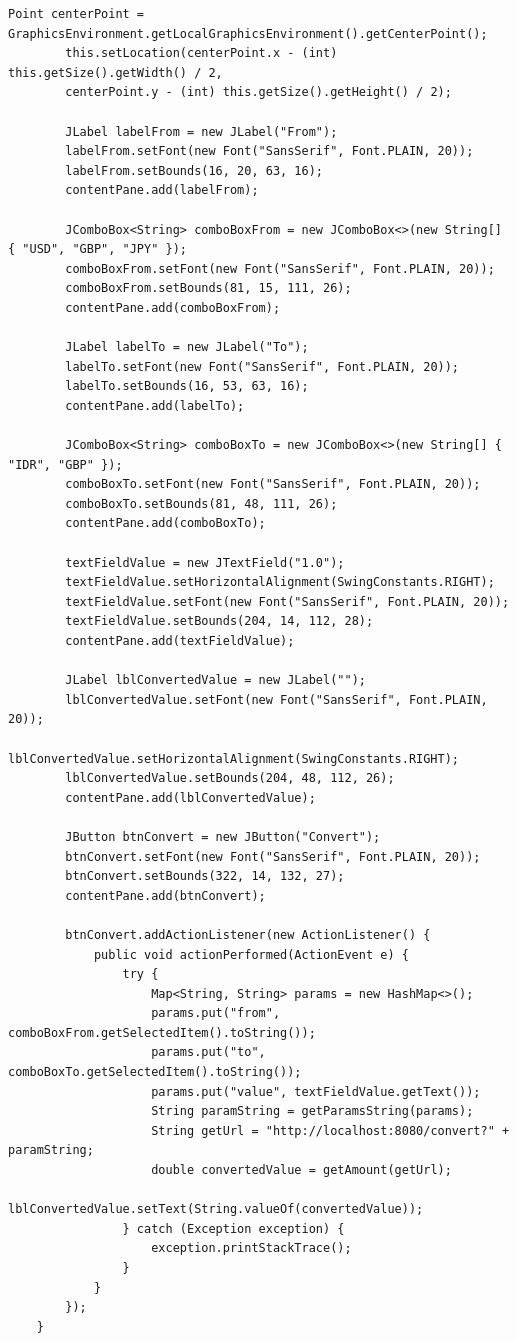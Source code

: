 \begin{enumerate}
\begin{lstlisting}[style=JavaStyle]
		Point centerPoint = GraphicsEnvironment.getLocalGraphicsEnvironment().getCenterPoint();
		this.setLocation(centerPoint.x - (int) this.getSize().getWidth() / 2,
		centerPoint.y - (int) this.getSize().getHeight() / 2);
		
		JLabel labelFrom = new JLabel("From");
		labelFrom.setFont(new Font("SansSerif", Font.PLAIN, 20));
		labelFrom.setBounds(16, 20, 63, 16);
		contentPane.add(labelFrom);
		
		JComboBox<String> comboBoxFrom = new JComboBox<>(new String[] { "USD", "GBP", "JPY" });
		comboBoxFrom.setFont(new Font("SansSerif", Font.PLAIN, 20));
		comboBoxFrom.setBounds(81, 15, 111, 26);
		contentPane.add(comboBoxFrom);
		
		JLabel labelTo = new JLabel("To");
		labelTo.setFont(new Font("SansSerif", Font.PLAIN, 20));
		labelTo.setBounds(16, 53, 63, 16);
		contentPane.add(labelTo);
		
		JComboBox<String> comboBoxTo = new JComboBox<>(new String[] { "IDR", "GBP" });
		comboBoxTo.setFont(new Font("SansSerif", Font.PLAIN, 20));
		comboBoxTo.setBounds(81, 48, 111, 26);
		contentPane.add(comboBoxTo);
		
		textFieldValue = new JTextField("1.0");
		textFieldValue.setHorizontalAlignment(SwingConstants.RIGHT);
		textFieldValue.setFont(new Font("SansSerif", Font.PLAIN, 20));
		textFieldValue.setBounds(204, 14, 112, 28);
		contentPane.add(textFieldValue);
		
		JLabel lblConvertedValue = new JLabel("");
		lblConvertedValue.setFont(new Font("SansSerif", Font.PLAIN, 20));
		lblConvertedValue.setHorizontalAlignment(SwingConstants.RIGHT);
		lblConvertedValue.setBounds(204, 48, 112, 26);
		contentPane.add(lblConvertedValue);
		
		JButton btnConvert = new JButton("Convert");
		btnConvert.setFont(new Font("SansSerif", Font.PLAIN, 20));
		btnConvert.setBounds(322, 14, 132, 27);
		contentPane.add(btnConvert);
		
		btnConvert.addActionListener(new ActionListener() {
			public void actionPerformed(ActionEvent e) {
				try {
					Map<String, String> params = new HashMap<>();
					params.put("from", comboBoxFrom.getSelectedItem().toString());
					params.put("to", comboBoxTo.getSelectedItem().toString());
					params.put("value", textFieldValue.getText());
					String paramString = getParamsString(params);
					String getUrl = "http://localhost:8080/convert?" + paramString;
					double convertedValue = getAmount(getUrl);
					lblConvertedValue.setText(String.valueOf(convertedValue));
				} catch (Exception exception) {
					exception.printStackTrace();
				}
			}
		});
	}
	

\end{lstlisting}
\end{enumerate}
